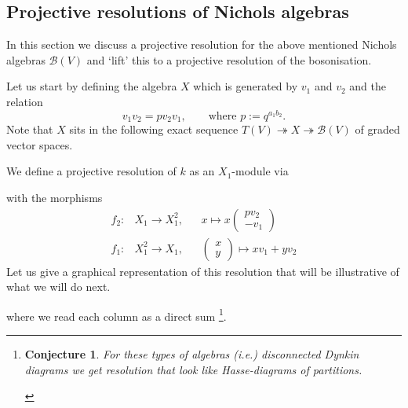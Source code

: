 \documentclass{amsart}
\newtheorem*{conjecture}{Conjecture}
\theoremstyle{definition}
\newcommand{\Nichols}[1]{\ensuremath{\mathcal{B}(#1)}}
\begin{document}
	\subsection{Projective resolutions of Nichols algebras}
	
	In this section we discuss a projective resolution for the above mentioned Nichols algebras $\Nichols V$ and `lift' this to a projective resolution of the bosonisation.
	
	Let us start by defining the algebra $X$ which is generated by $v_1$ and $v_2$  and the relation
	$$
	v_1 v_2 = p v_2 v_1, \qquad \text{where } p:= q^{a_1 b_2}.
	$$
	Note that $X$ sits in the following exact sequence $T(V) \twoheadrightarrow X\twoheadrightarrow \Nichols V$ of graded vector spaces.
	
	We define a projective resolution of $k$ as an $X_1$-module via
	\begin{center}
	\end{center}
	with the morphisms
	\begin{align*}
	f_2: & X_1 \rightarrow X_1^2,  && x \mapsto
	x\begin{pmatrix}
	p v_2 \\
	- v_1
	\end{pmatrix}
	\\
	f_1: & X_1^2\rightarrow X_1,  && \begin{pmatrix} x \\ y\end{pmatrix} \mapsto
	x v_1 + y v_2
	\end{align*}
	Let us give a graphical representation of this resolution that will be illustrative of what we will do next.
	\begin{center}
	\end{center}
	where we read each column as a direct sum \footnote{
		\begin{conjecture}
			For these types of algebras (i.e.) disconnected Dynkin diagrams we get resolution that look like Hasse-diagrams of partitions.
			
		\end{conjecture} 
	}.
\end{document}

